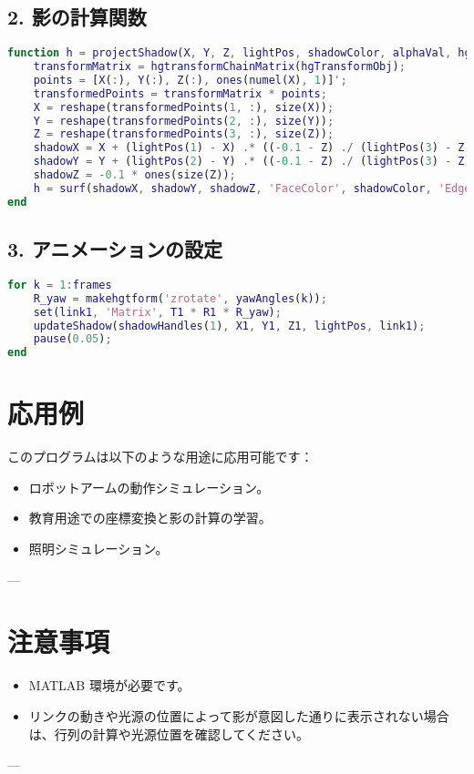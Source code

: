 \documentclass[a4paper,12pt]{article}
\begin{document}
\subsection*{2. 影の計算関数}
\begin{lstlisting}[language=Matlab]
function h = projectShadow(X, Y, Z, lightPos, shadowColor, alphaVal, hgTransformObj)
    transformMatrix = hgtransformChainMatrix(hgTransformObj);
    points = [X(:), Y(:), Z(:), ones(numel(X), 1)]';
    transformedPoints = transformMatrix * points;
    X = reshape(transformedPoints(1, :), size(X));
    Y = reshape(transformedPoints(2, :), size(Y));
    Z = reshape(transformedPoints(3, :), size(Z));
    shadowX = X + (lightPos(1) - X) .* ((-0.1 - Z) ./ (lightPos(3) - Z));
    shadowY = Y + (lightPos(2) - Y) .* ((-0.1 - Z) ./ (lightPos(3) - Z));
    shadowZ = -0.1 * ones(size(Z));
    h = surf(shadowX, shadowY, shadowZ, 'FaceColor', shadowColor, 'EdgeColor', 'none', 'FaceAlpha', alphaVal);
end
\end{lstlisting}

\subsection*{3. アニメーションの設定}
\begin{lstlisting}[language=Matlab]
for k = 1:frames
    R_yaw = makehgtform('zrotate', yawAngles(k));
    set(link1, 'Matrix', T1 * R1 * R_yaw);
    updateShadow(shadowHandles(1), X1, Y1, Z1, lightPos, link1);
    pause(0.05);
end
\end{lstlisting}


\section*{応用例}
このプログラムは以下のような用途に応用可能です：
\begin{itemize}
    \item ロボットアームの動作シミュレーション。
    \item 教育用途での座標変換と影の計算の学習。
    \item 照明シミュレーション。
\end{itemize}

---

\section*{注意事項}
\begin{itemize}
    \item MATLAB 環境が必要です。
    \item リンクの動きや光源の位置によって影が意図した通りに表示されない場合は、行列の計算や光源位置を確認してください。
\end{itemize}

---
\end{document}
